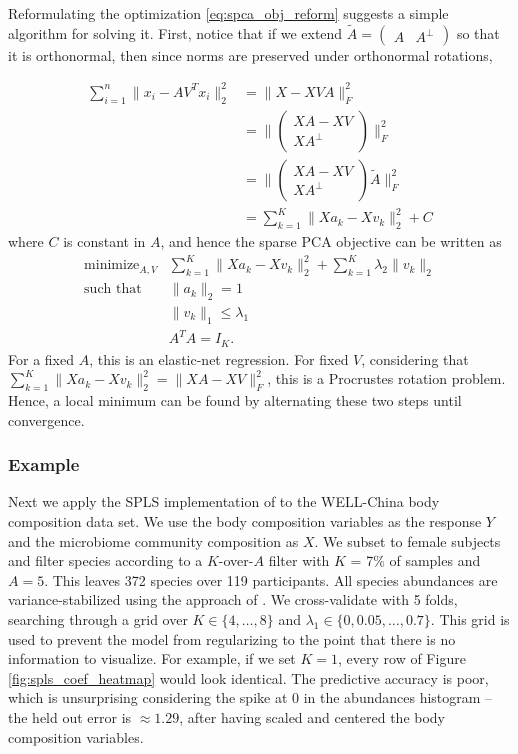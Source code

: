 \documentclass[14pt]{extarticle}
\begin{document}
Reformulating the optimization \ref{eq:spca_obj_reform} suggests a simple
algorithm for solving it. First, notice that if we extend $\tilde{A}
= \begin{pmatrix} A & A^{\perp}\end{pmatrix}$ so that it is orthonormal, then
since norms are preserved under orthonormal rotations,

\begin{align*}
  \sum_{i = 1}^{n} \|x_i - AV^T x_i\|_2^2 &= \|X - XVA\|_{F}^2 \\
  &= \|\begin{pmatrix} XA - XV \\ XA^{\perp} \end{pmatrix} \|_{F}^2 \\
  &= \|\begin{pmatrix} XA - XV \\ XA^{\perp} \end{pmatrix} \tilde{A} \|_{F}^2 \\
  &= \sum_{k = 1}^{K} \|Xa_k - X v_k\|_2^2 + C
\end{align*}
where $C$ is constant in $A$, and hence the sparse PCA objective can be written
as
\begin{align*}
  \text{minimize}_{A, V} &\sum_{k = 1}^{K} \|Xa_k - X v_k\|_2^2 + \sum_{k = 1}^{K} \lambda_2 \|v_k\|_2 \\
  \text{such that }&\|a_k\|_2 = 1 \\
  & \|v_k\|_1 \leq \lambda_1 \\
  &A^TA = I_K.
\end{align*}
For a fixed $A$, this is an elastic-net regression. For fixed $V$, considering
that $\sum_{k = 1}^{K} \|Xa_k - Xv_k\|^2_2 = \|XA - XV\|_F^2$, this is a
Procrustes rotation problem. Hence, a local minimum can be found by alternating
these two steps until convergence.

\subsubsection{Example}
\label{subsubsec:spls_example}

Next we apply the SPLS implementation of \cite{chung2012spls} to the WELL-China
body composition data set. We use the body composition variables as the response
$Y$ and the microbiome community composition as $X$. We subset to female
subjects and filter species according to a $K$-over-$A$ filter with $K$ = 7\% of
samples and $A = 5$. This leaves 372 species over 119 participants. All species
abundances are variance-stabilized using the approach of
\cite{anders2010differential}. We cross-validate with 5 folds, searching through
a grid over $K \in \{4, \dots, 8\}$ and $\lambda_1 \in \{0, 0.05, \dots, 0.7\}$.
This grid is used to prevent the model from regularizing to the point that there
is no information to visualize. For example, if we set $K = 1$, every row of
Figure \ref{fig:spls_coef_heatmap} would look identical. The predictive accuracy
is poor, which is unsurprising considering the spike at 0 in the abundances
histogram -- the held out error is $\approx 1.29$, after having scaled and
centered the body composition variables.
\end{document}
